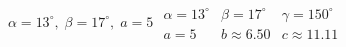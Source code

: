{ $\alpha = 13^{\circ}, \; \beta = 17^{\circ}, \; a = 5$ \label{firstlawofsines}}
{$\begin{array}{lll}\alpha = 13^{\circ} & \beta = 17^{\circ} & \gamma = 150^{\circ} \\a = 5 & b \approx 6.50 & c \approx 11.11 \end{array}$}
